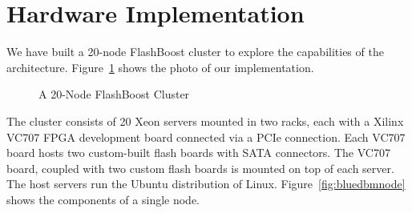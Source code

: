 \section{Hardware Implementation}
\label{sec:implementation}

We have built a 20-node FlashBoost cluster to explore the capabilities of the
architecture. Figure~\ref{fig:bluedbmcluster} shows the photo of our
implementation.


\begin{figure}[ht!]
	\centering
	\caption{A 20-Node FlashBoost Cluster}
	\label{fig:bluedbmcluster}
\end{figure}

The cluster consists of 20 Xeon servers mounted in two racks, each with a Xilinx
VC707 FPGA development board connected via a PCIe connection. Each VC707 board
hosts two custom-built flash boards with SATA connectors. The VC707 board,
coupled with two custom flash boards is mounted on top of each server.
The host servers run the Ubuntu distribution of Linux.
Figure~\ref{fig:bluedbmnode} shows the components of a single node.

